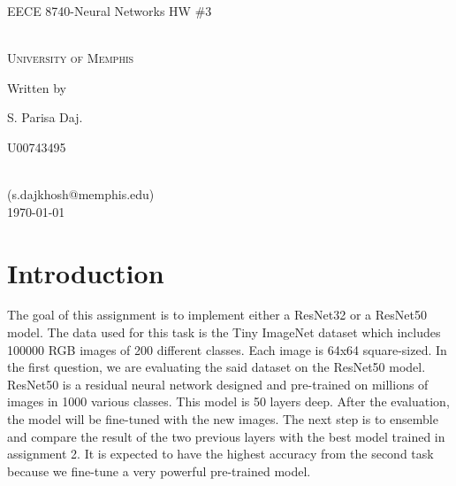 \documentclass[12pt,oneside,geqno]{article}
\begin{document}
	
	\begin{center}
		{\LARGE EECE 8740-Neural Networks HW \#3}%
		\vspace*{1\baselineskip}   
		
		\scshape %
		\color{red}{(Solutions)}\\
		\vspace*{1\baselineskip}
		\color{black}University of Memphis\\[\baselineskip]
		\vspace*{5\baselineskip} 
		
		Written by \\[\baselineskip]
		{\Large S. Parisa Daj.\par U00743495} \\
		(s.dajkhosh@memphis.edu)\\
		
		\vspace*{1\baselineskip}
		\today
	\end{center}
	\clearpage
	
	
	\section{Introduction}
	The goal of this assignment is to implement either a ResNet32 or a ResNet50 model. The data used for this task is the Tiny ImageNet dataset which includes 100000 RGB images of 200 different classes. Each image is 64x64 square-sized. In the first question, we are evaluating the said dataset on the ResNet50 model. ResNet50 is a residual neural network designed and pre-trained on millions of images in 1000 various classes. This model is 50 layers deep. After the evaluation, the model will be fine-tuned with the new images. The next step is to ensemble and compare the result of the two previous layers with the best model trained in assignment 2. It is expected to have the highest accuracy from the second task because we fine-tune a very powerful pre-trained model. 
	
\end{document}
